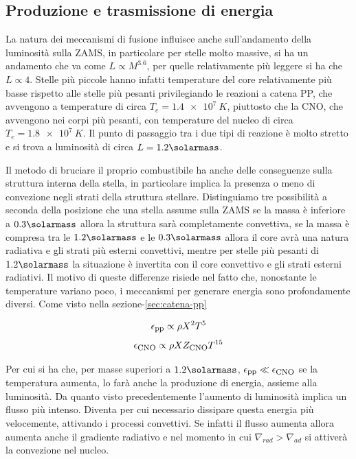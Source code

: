 \subsection{Produzione e trasmissione di energia}\label{sec:prod-tras-energia}

La natura dei meccanismi di fusione influisce anche sull'andamento della luminosità sulla ZAMS, in particolare per stelle molto massive, si ha un andamento che va come $L \propto M^{3.6}$, per quelle relativamente più leggere si ha che $L \propto 4$.  Stelle più piccole hanno infatti temperature del core relativamente più basse rispetto alle stelle più pesanti privilegiando le reazioni a catena PP, che avvengono a temperature di circa $T_e = \SI{1.4e7}{K}$, piuttosto che la CNO, che avvengono nei corpi più pesanti, con temperature del nucleo di circa $T_e = \SI{1.8e7}{K}$. Il punto di passaggio tra i due tipi di reazione è molto stretto e si trova a luminosità di circa $L = 1.2 \si{\solarmass}$.

Il metodo di bruciare il proprio combustibile ha anche delle conseguenze sulla struttura interna della stella, in particolare implica la presenza o meno di convezione negli strati della struttura stellare. Distinguiamo tre possibilità a seconda della posizione che una stella assume sulla ZAMS\: se la massa è inferiore a $0.3 \si{\solarmass}$ allora la struttura sarà completamente convettiva, se la massa è compresa tra le $1.2 \si{\solarmass}$ e le $0.3 \si{\solarmass}$ allora il core avrà una natura radiativa e gli strati più esterni convettivi, mentre per stelle più pesanti di $1.2 \si{\solarmass}$ la situazione è invertita con il core convettivo e gli strati esterni radiativi. Il motivo di queste differenze risiede nel fatto che, nonostante le temperature variano poco, i meccanismi per generare energia sono profondamente diversi. Come visto nella sezione-\ref{sec:catena-pp}

\[
    \epsilon_{\mbox{\footnotesize{pp}}} \propto \rho X^2 T^5
\]
\[
    \epsilon_{\mbox{\footnotesize{CNO}}} \propto \rho X Z_{\mbox{\footnotesize{CNO}}} T^{15}
\]

Per cui si ha che, per masse superiori a $1.2 \si{\solarmass}$, $\epsilon_{\mbox{\footnotesize{pp}}} \ll \epsilon_{\mbox{\footnotesize{CNO}}}$ se la temperatura aumenta, lo farà anche la produzione di energia, assieme alla luminosità. Da quanto visto precedentemente l'aumento di luminosità implica un flusso più intenso. Diventa per cui necessario dissipare questa energia più velocemente, attivando i processi convettivi. Se infatti il flusso aumenta allora aumenta anche il gradiente radiativo e nel momento in cui $\nabla_{rad} > \nabla_{ad}$ si attiverà la convezione nel nucleo.

